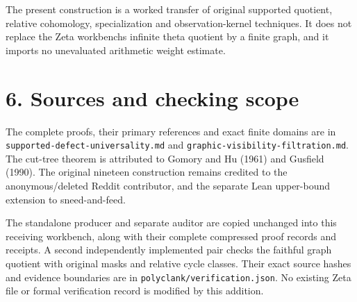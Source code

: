 The present construction is a worked transfer of original supported quotient, relative cohomology, specialization and observation-kernel techniques. It does not replace the Zeta workbench\textquotesingle s infinite theta quotient by a finite graph, and it imports no unevaluated arithmetic weight estimate.

\section{6. Sources and checking scope}\label{n13-sources-and-checking-scope}

The complete proofs, their primary references and exact finite domains are in \nolinkurl{supported-defect-universality.md} and \nolinkurl{graphic-visibility-filtration.md}. The cut-tree theorem is attributed to Gomory and Hu (1961) and Gusfield (1990). The original nineteen construction remains credited to the anonymous/deleted Reddit contributor, and the separate Lean upper-bound extension to sneed-and-feed.

The standalone producer and separate auditor are copied unchanged into this receiving workbench, along with their complete compressed proof records and receipts. A second independently implemented pair checks the faithful graph quotient with original masks and relative cycle classes. Their exact source hashes and evidence boundaries are in \texttt{polyclank/verification.json}. No existing Zeta file or formal verification record is modified by this addition.
